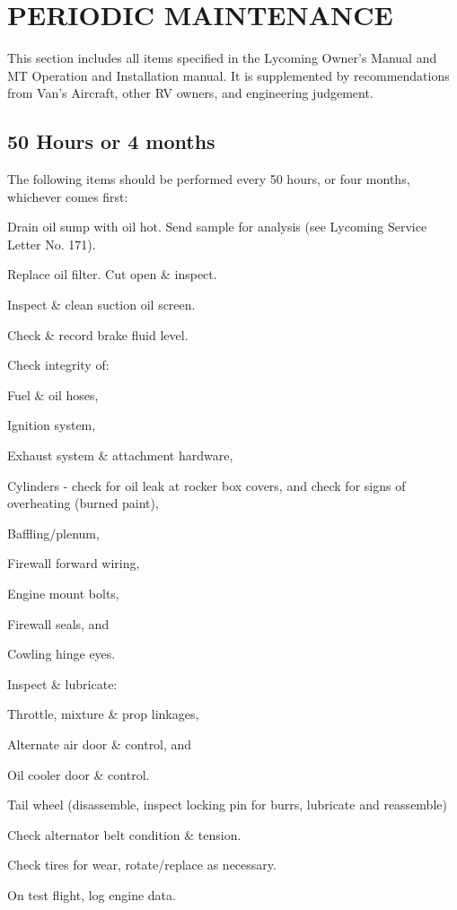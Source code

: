 \section{PERIODIC MAINTENANCE} This section includes all items specified in the Lycoming Owner's Manual and MT Operation and Installation manual. It is supplemented by recommendations from Van's Aircraft, other RV owners, and engineering judgement.

\subsection{50 Hours or 4 months} The following items should be performed every 50 hours, or four months, whichever comes first:
\begin{enumerate*}
	\item Drain oil sump with oil hot. Send sample for analysis (see Lycoming Service Letter No. 171). 
	\item Replace oil filter. Cut open \& inspect. 
	\item Inspect \& clean suction oil screen. 
	\item Check \& record brake fluid level. 
	\item Check integrity of: 
	\begin{enumerate*}
		\item Fuel \& oil hoses, 
		\item Ignition system, 
		\item Exhaust system \& attachment hardware, 
		\item Cylinders - check for oil leak at rocker box covers, and check for signs of overheating (burned paint), 
		\item Baffling/plenum, 
		\item Firewall forward wiring, 
		\item Engine mount bolts, 
		\item Firewall seals, and 
		\item Cowling hinge eyes. 
	\end{enumerate*}
	\item Inspect \& lubricate: 
	\begin{enumerate*}
		\item Throttle, mixture \& prop linkages, 
		\item Alternate air door \& control, and 
		\item Oil cooler door \& control. 
		\item Tail wheel (disassemble, inspect locking pin for burrs, lubricate and reassemble) 
	\end{enumerate*}
	\item Check alternator belt condition \& tension. 
	\item Check tires for wear, rotate/replace as necessary. 
	\item On test flight, log engine data. 
\end{enumerate*}

